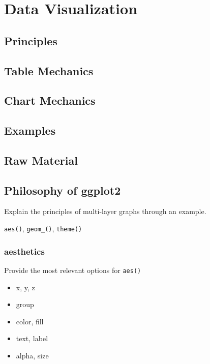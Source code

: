 \documentclass[
]{book}
\providecommand{\tightlist}{%
  \setlength{\itemsep}{0pt}\setlength{\parskip}{0pt}}
\begin{document}
\hypertarget{data_viz}{%
\chapter{Data Visualization}\label{data_viz}}

\hypertarget{principles-2}{%
\section{Principles}\label{principles-2}}

\hypertarget{table-mechanics}{%
\section{Table Mechanics}\label{table-mechanics}}

\hypertarget{chart-mechanics}{%
\section{Chart Mechanics}\label{chart-mechanics}}

\hypertarget{examples}{%
\section{Examples}\label{examples}}

\hypertarget{raw-material-3}{%
\section{Raw Material}\label{raw-material-3}}

\hypertarget{philosophy-of-ggplot2}{%
\section{Philosophy of ggplot2}\label{philosophy-of-ggplot2}}

Explain the principles of multi-layer graphs through an example.

\texttt{aes()}, \texttt{geom\_()}, \texttt{theme()}

\hypertarget{aesthetics}{%
\subsection{aesthetics}\label{aesthetics}}

Provide the most relevant options for \texttt{aes()}

\begin{itemize}
\tightlist
\item
  x, y, z
\item
  group
\item
  color, fill
\item
  text, label
\item
  alpha, size
\end{itemize}
\end{document}

